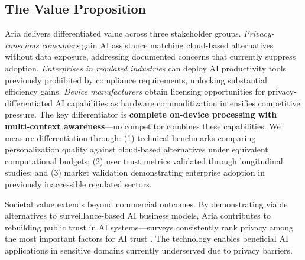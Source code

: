 \documentclass[11pt]{article}
\newcommand{\TODO}[1]{\textcolor{red}{[TODO: #1]}}
\begin{document}
\subsection{The Value Proposition}
\vspace*{-8pt}
Aria delivers differentiated value across three stakeholder groups. \textit{Privacy-conscious consumers} gain AI assistance matching cloud-based alternatives without data exposure, addressing documented concerns that currently suppress adoption. \textit{Enterprises in regulated industries} can deploy AI productivity tools previously prohibited by compliance requirements, unlocking substantial efficiency gains. \textit{Device manufacturers} obtain licensing opportunities for privacy-differentiated AI capabilities as hardware commoditization intensifies competitive pressure.
The key differentiator is \textbf{complete on-device processing with multi-context awareness}---no competitor combines these capabilities. We measure differentiation through: (1) technical benchmarks comparing personalization quality against cloud-based alternatives under equivalent computational budgets; (2) user trust metrics validated through longitudinal studies; and (3) market validation demonstrating enterprise adoption in previously inaccessible regulated sectors.

Societal value extends beyond commercial outcomes. By demonstrating viable alternatives to surveillance-based AI business models, Aria contributes to rebuilding public trust in AI systems---surveys consistently rank privacy among the most important factors for AI trust \cite{gillespie2023trust}. The technology enables beneficial AI applications in sensitive domains currently underserved due to privacy barriers.



\end{document}

